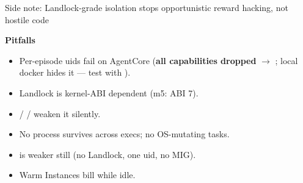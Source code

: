 \begin{frame}{Side note: Landlock-grade isolation stops opportunistic reward hacking, not hostile code}
{\footnotesize\textbf{\color{awsteal}Pitfalls}\par}
\begin{itemize}\footnotesize\setlength{\itemsep}{1.4mm}
\item Per-episode uids fail on AgentCore (\textbf{all capabilities dropped} $\rightarrow$  ; local docker hides it --- test with ).
\item Landlock is kernel-ABI dependent (m5: ABI 7).
\item {} /  /  weaken it silently.
\item No process survives across execs; no OS-mutating tasks.
\item {} is weaker still (no Landlock, one uid, no MIG).
\item Warm Instances bill while idle.
\end{itemize}
\vspace{3mm}
\end{frame}


